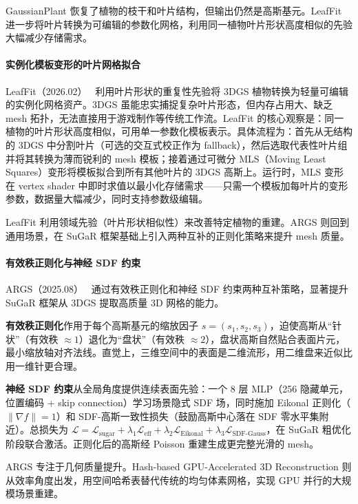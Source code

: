 GaussianPlant 恢复了植物的枝干和叶片结构，但输出仍然是高斯基元。LeafFit 进一步将叶片转换为可编辑的参数化网格，利用同一植物叶片形状高度相似的先验大幅减少存储需求。

\paragraph{实例化模板变形的叶片网格拟合}

LeafFit（2026.02）~\cite{2602_11577} 利用叶片形状的重复性先验将 3DGS 植物转换为轻量可编辑的实例化网格资产。3DGS 虽能忠实捕捉复杂叶片形态，但内存占用大、缺乏 mesh 拓扑，无法直接用于游戏制作等传统工作流。LeafFit 的核心观察是：同一植物的叶片形状高度相似，可用单一参数化模板表示。具体流程为：首先从无结构的 3DGS 中分割叶片（可选的交互式校正作为 fallback），然后选取代表性叶片组并将其转换为薄而锐利的 mesh 模板；接着通过可微分 MLS（Moving Least Squares）变形将模板拟合到所有其他叶片的 3DGS 高斯上。运行时，MLS 变形在 vertex shader 中即时求值以最小化存储需求——只需一个模板加每叶片的变形参数，数据量大幅减少，同时支持参数级编辑。

LeafFit 利用领域先验（叶片形状相似性）来改善特定植物的重建。ARGS 则回到通用场景，在 SuGaR 框架基础上引入两种互补的正则化策略来提升 mesh 质量。

\paragraph{有效秩正则化与神经 SDF 约束}

ARGS（2025.08）~\cite{2508_21344} 通过有效秩正则化和神经 SDF 约束两种互补策略，显著提升 SuGaR 框架从 3DGS 提取高质量 3D 网格的能力。

\textbf{有效秩正则化}作用于每个高斯基元的缩放因子 $s = (s_1, s_2, s_3)$，迫使高斯从“针状”（有效秩 $\approx 1$）退化为“盘状”（有效秩 $\approx 2$），盘状高斯自然贴合表面片元，最小缩放轴对齐法线。直觉上，三维空间中的表面是二维流形，用二维盘来近似比用一维针更合理。

\textbf{神经 SDF 约束}从全局角度提供连续表面先验：一个 8 层 MLP（256 隐藏单元，位置编码 + skip connection）学习场景隐式 SDF 场，同时施加 Eikonal 正则化（$\|\nabla f\| = 1$）和 SDF-高斯一致性损失（鼓励高斯中心落在 SDF 零水平集附近）。总损失为 $\mathcal{L} = \mathcal{L}_{\text{sugar}} + \lambda_1 \mathcal{L}_{\text{eff}} + \lambda_2 \mathcal{L}_{\text{Eikonal}} + \lambda_3 \mathcal{L}_{\text{SDF-Gauss}}$，在 SuGaR 粗优化阶段联合激活。正则化后的高斯经 Poisson 重建生成更完整光滑的 mesh。

ARGS 专注于几何质量提升。Hash-based GPU-Accelerated 3D Reconstruction 则从效率角度出发，用空间哈希表替代传统的均匀体素网格，实现 GPU 并行的大规模场景重建。


